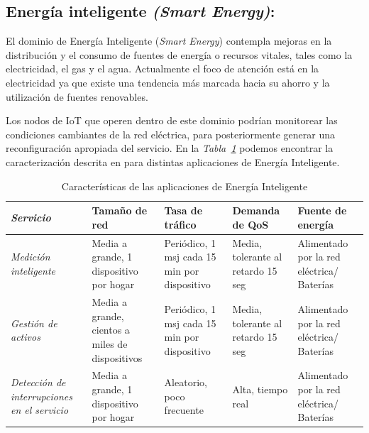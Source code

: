 \subsection{Energía inteligente \textit{(Smart Energy)}:}

El dominio de Energía Inteligente (\textit{Smart Energy}) contempla mejoras en la distribución y el consumo de fuentes de energía o recursos vitales, tales como la electricidad, el gas y el agua. Actualmente el foco de atención está en la electricidad ya que existe una tendencia más marcada hacia su ahorro y la utilización de fuentes renovables. \newline

Los nodos de IoT que operen dentro de este dominio podrían monitorear las condiciones cambiantes de la red eléctrica, para posteriormente generar una reconfiguración apropiada del servicio. En la \textit{Tabla~\ref{tab:smartenergy}} podemos encontrar la caracterización descrita en \parencite{NetTrafficIoT} para distintas aplicaciones de Energía Inteligente.

\begin{table}
\caption{Características de las aplicaciones de Energía Inteligente}
\label{tab:smartenergy}
\centering
\begin{tabular}{*{5}{m{3cm}}}  \\  
\textbf{\textit{Servicio}} & \textbf{Tamaño de red} & \textbf{Tasa de tráfico} & \textbf{Demanda de QoS} & \textbf{Fuente de energía} \\ \hline \hline
\textit{Medición inteligente}  & \footnotesize{ Media a grande, 1 dispositivo por hogar } & \footnotesize{ Periódico, 1 msj cada 15 min por dispositivo } & \footnotesize{ Media, tolerante al retardo 15 seg } & \footnotesize{ Alimentado por la red eléctrica/ Baterías } \\ \hline 
\textit{Gestión de activos}  & \footnotesize{ Media a grande, cientos a miles de dispositivos } & \footnotesize{ Periódico, 1 msj cada 15 min por dispositivo } & \footnotesize{ Media, tolerante al retardo 15 seg } & \footnotesize{ Alimentado por la red eléctrica/ Baterías } \\ \hline 
\textit{Detección de interrupciones en el servicio } & \footnotesize{ Media a grande, 1 dispositivo por hogar } & \footnotesize{ Aleatorio, poco frecuente } & \footnotesize{ Alta, tiempo real } & \footnotesize{ Alimentado por la red eléctrica/ Baterías } \\ 
\end{tabular}
\end{table}

